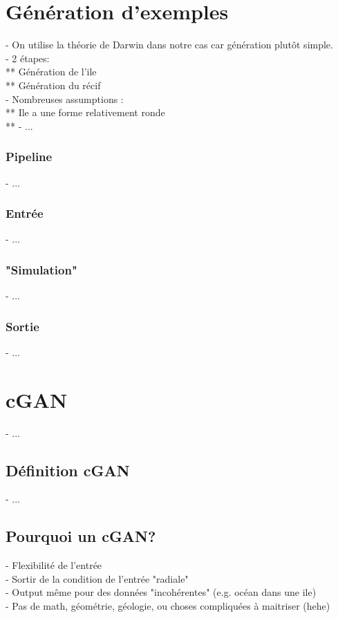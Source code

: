 \section{Génération d'exemples}
- On utilise la théorie de Darwin dans notre cas car génération plutôt simple. \\
- 2 étapes: \\
** Génération de l'ile \\
** Génération du récif \\
- Nombreuses assumptions : \\
** Ile a une forme relativement ronde \\
** 
- ... 

\subsubsection{Pipeline}
- ...

\subsubsection{Entrée}
- ...

\subsubsection{"Simulation"}
- ...

\subsubsection{Sortie}
- ...

\section{cGAN}
- ...

\subsection{Définition cGAN}
- ...

\subsection{Pourquoi un cGAN?}
- Flexibilité de l'entrée \\
- Sortir de la condition de l'entrée "radiale" \\
- Output même pour des données "incohérentes" (e.g. océan dans une ile) \\
- Pas de math, géométrie, géologie, ou choses compliquées à maitriser (hehe)

